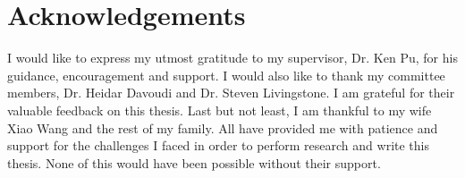 \chapter*{Acknowledgements}

I would like to express my utmost gratitude to my supervisor, Dr. Ken Pu, for
his guidance, encouragement and support. 
I would also like to thank my committee members, Dr. Heidar Davoudi and
Dr. Steven Livingstone. I am grateful for their valuable feedback on this thesis.
Last but not least, I am thankful to my wife Xiao Wang and the rest of my family.
All have provided me with patience and support for the challenges I faced
in order to perform research and write this thesis.
None of this would have been possible without their support.
